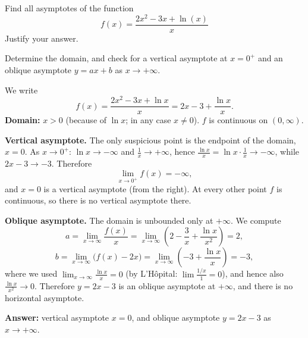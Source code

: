 
\begin{question}
Find all asymptotes of the function
\[ f(x) = \frac{2x^2 - 3x + \ln(x)}{x} \]
Justify your answer.
\end{question}

\begin{hint}
Determine the domain, and check for a vertical asymptote at $x = 0^+$ and an oblique asymptote $y = ax + b$ as $x \to +\infty$.
\end{hint}

\begin{solution}
We write
\[ f(x) = \frac{2x^2 - 3x + \ln x}{x} = 2x - 3 + \frac{\ln x}{x}. \]
\textbf{Domain:} $x > 0$ (because of $\ln x$; in any case $x \ne 0$). $f$ is continuous on $(0, \infty)$.

\textbf{Vertical asymptote.} The only suspicious point is the endpoint of the domain, $x = 0$. As $x \to 0^+$: $\ln x \to -\infty$ and $\frac1x \to +\infty$, hence $\frac{\ln x}{x} = \ln x\cdot\frac1x \to -\infty$, while $2x - 3 \to -3$. Therefore
\[ \lim_{x\to0^+} f(x) = -\infty, \]
and $x = 0$ is a vertical asymptote (from the right). At every other point $f$ is continuous, so there is no vertical asymptote there.

\textbf{Oblique asymptote.} The domain is unbounded only at $+\infty$. We compute
\[ a = \lim_{x\to\infty}\frac{f(x)}{x} = \lim_{x\to\infty}\left( 2 - \frac3x + \frac{\ln x}{x^2} \right) = 2, \]
\[ b = \lim_{x\to\infty}\bigl(f(x) - 2x\bigr) = \lim_{x\to\infty}\left( -3 + \frac{\ln x}{x} \right) = -3, \]
where we used $\lim_{x\to\infty}\frac{\ln x}{x} = 0$ (by L'Hôpital: $\lim \frac{1/x}{1} = 0$), and hence also $\frac{\ln x}{x^2} \to 0$. Therefore $y = 2x - 3$ is an oblique asymptote at $+\infty$, and there is no horizontal asymptote.

\textbf{Answer:} vertical asymptote $x = 0$, and oblique asymptote $y = 2x - 3$ as $x \to +\infty$.
\end{solution}
